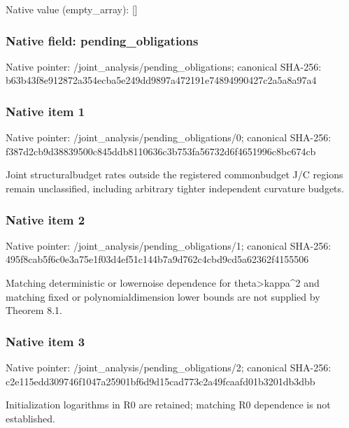 \documentclass[10pt,a4paper]{article}
\begin{document}
Native value (empty\_array): []



\subsubsection{Native field: pending\_obligations}


Native pointer: /joint\_analysis/pending\_obligations; canonical SHA-256: b63b43f8e912872a354ecba5\allowbreak{}e249dd9897a472191e748949\allowbreak{}90427c2a5a8a97a4



\subsubsection{Native item 1}


Native pointer: /joint\_analysis/pending\_obligations/0; canonical SHA-256: f387d2cb9d38839500c845dd\allowbreak{}b8110636c3b753fa56732d6f\allowbreak{}4651996c8bc674cb


Joint structuralbudget rates outside the registered commonbudget J/C regions remain unclassified, including arbitrary tighter independent curvature budgets.


\subsubsection{Native item 2}


Native pointer: /joint\_analysis/pending\_obligations/1; canonical SHA-256: 495f8cab5f6c0e3a75e1f03d\allowbreak{}4ef51c144b7a9d762c4cbd9c\allowbreak{}d5a62362f4155506


Matching deterministic or lowernoise dependence for theta>kappa\textasciicircum{}2 and matching fixed or polynomialdimension lower bounds are not supplied by Theorem 8.1.


\subsubsection{Native item 3}


Native pointer: /joint\_analysis/pending\_obligations/2; canonical SHA-256: c2e115edd309746f1047a259\allowbreak{}01bf6d9d15cad773c2a49fca\allowbreak{}afd01b3201db3dbb


Initialization logarithms in R0 are retained; matching R0 dependence is not established.
\end{document}
